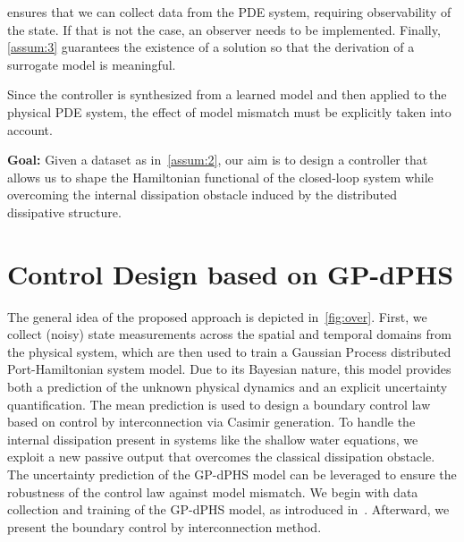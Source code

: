 \documentclass[letterpaper, 10 pt, conference]{ieeeconf}  %
\begin{document}
 ensures that we can collect data from the PDE system, requiring observability of the state. If that is not the case, an observer needs to be implemented. Finally, \cref{assum:3} guarantees the existence of a solution so that the derivation of a surrogate model is meaningful.

Since the controller is synthesized from a learned model and then applied to the physical PDE system, the effect of model mismatch must be explicitly taken into account.

\textbf{Goal:} Given a dataset as in~\cref{assum:2}, our aim is to design a controller that allows us to shape the Hamiltonian functional of the closed-loop system while overcoming the internal dissipation obstacle induced by the distributed dissipative structure.

\section{Control Design based on GP-dPHS}
\label{sec:ctrl}
The general idea of the proposed approach is depicted in~\cref{fig:over}. First, we collect (noisy) state measurements across the spatial and temporal domains from the physical system, which are then used to train a Gaussian Process distributed Port-Hamiltonian system model. Due to its Bayesian nature, this model provides both a prediction of the unknown physical dynamics and an explicit uncertainty quantification. The mean prediction is used to design a boundary control law based on control by interconnection via Casimir generation. To handle the internal dissipation present in systems like the shallow water equations, we exploit a new passive output that overcomes the classical dissipation obstacle. The uncertainty prediction of the GP-dPHS model can be leveraged to ensure the robustness of the control law against model mismatch. We begin with data collection and training of the GP-dPHS model, as introduced in~\cite{tan2024physics}. Afterward, we present the boundary control by interconnection method.
\end{document}
